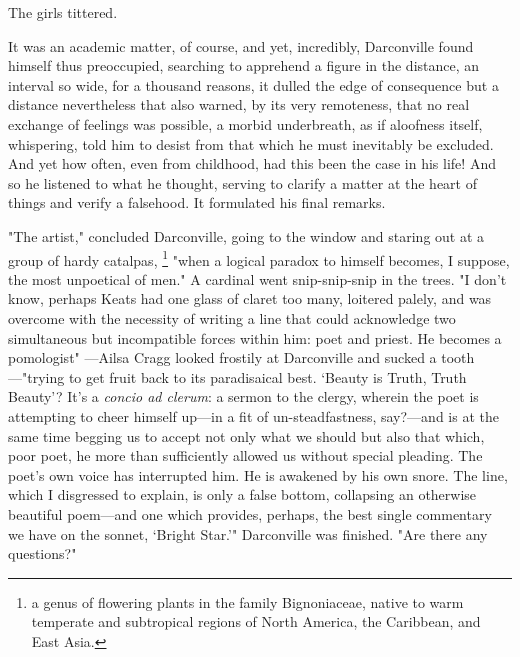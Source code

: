  The girls tittered.

  It was an academic matter, of course, and yet, incredibly, Darconville found
himself thus preoccupied, searching to apprehend 
a figure in the distance, an
interval so wide, for a thousand reasons, it dulled the edge of consequence but
a distance nevertheless that also warned, by its very remoteness, that no real
exchange of feelings was possible, a morbid 
underbreath, as if aloofness itself, whispering, told him to desist 
from that which he must inevitably be excluded.
And yet how often, even from childhood, had this been the case in his life! And
so he listened to what he thought, serving to clarify a matter at the heart of
things and verify a falsehood. It formulated his final remarks.

  "The artist," concluded Darconville, going to the window and staring out at a
group of hardy catalpas, 
\footnote{ a genus of flowering plants in the family Bignoniaceae, native to warm 
temperate and subtropical regions of North America, the Caribbean, and East Asia. }
"when a logical paradox to himself becomes, I suppose,
the most unpoetical of men." A cardinal went snip-snip-snip in the trees. "I
don't know, perhaps Keats had one glass of claret 
too many, loitered 
palely, and was overcome with the necessity of writing a line that could 
acknowledge two simultaneous but incompatible forces within him: poet and 
priest. He becomes a pomologist"
---Ailsa Cragg looked frostily at Darconville and sucked a
tooth---"trying to get fruit back to its paradisaical best. `Beauty is Truth,
Truth Beauty'? It's a \textit{concio ad clerum}: 
a sermon to the clergy, wherein the poet
is attempting to cheer himself up---in a fit of un-steadfastness, say?---and is at
the same time begging us to accept not only what we should but also that which,
poor poet, he more than sufficiently allowed us without special pleading. The
poet's own voice has interrupted him. He is awakened by his own snore. The line,
which I disgressed to explain, is only a false bottom, collapsing an otherwise
beautiful poem---and one which provides, perhaps, the best single commentary we
have on the sonnet, `Bright Star.'" Darconville was finished. "Are there any
questions?"

